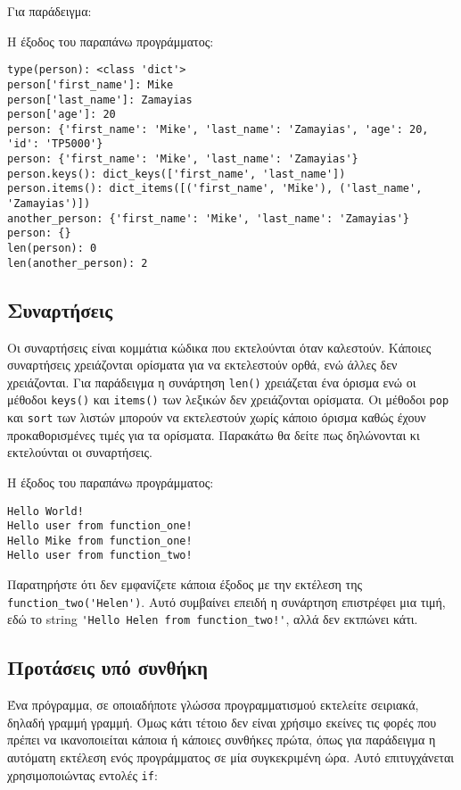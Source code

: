 \documentclass[12pt]{extreport}
\begin{document}
Για παράδειγμα:



Η έξοδος του παραπάνω προγράμματος:

\begin{lstlisting}[language={}]
type(person): <class 'dict'>
person['first_name']: Mike
person['last_name']: Zamayias
person['age']: 20
person: {'first_name': 'Mike', 'last_name': 'Zamayias', 'age': 20, 'id': 'TP5000'}
person: {'first_name': 'Mike', 'last_name': 'Zamayias'}
person.keys(): dict_keys(['first_name', 'last_name'])
person.items(): dict_items([('first_name', 'Mike'), ('last_name', 'Zamayias')])
another_person: {'first_name': 'Mike', 'last_name': 'Zamayias'}
person: {}
len(person): 0
len(another_person): 2
\end{lstlisting}




\newpage
\subsection{Συναρτήσεις}
Οι συναρτήσεις είναι κομμάτια κώδικα που εκτελούνται όταν καλεστούν. Κάποιες συναρτήσεις χρειάζονται ορίσματα για να εκτελεστούν ορθά, ενώ άλλες δεν χρειάζονται. Για παράδειγμα η συνάρτηση \lstinline{len()} χρειάζεται ένα όρισμα ενώ οι μέθοδοι \lstinline{keys()} και \lstinline{items()} των λεξικών δεν χρειάζονται ορίσματα. Οι μέθοδοι \lstinline{pop} και \lstinline{sort} των λιστών μπορούν να εκτελεστούν χωρίς κάποιο όρισμα καθώς έχουν προκαθορισμένες τιμές για τα ορίσματα. Παρακάτω θα δείτε πως δηλώνονται κι εκτελούνται οι συναρτήσεις.



Η έξοδος του παραπάνω προγράμματος:

\begin{lstlisting}[language={}]
Hello World!
Hello user from function_one!
Hello Mike from function_one!
Hello user from function_two!
\end{lstlisting}

Παρατηρήστε ότι δεν εμφανίζετε κάποια έξοδος με την εκτέλεση της \lstinline{function_two('Helen')}. Αυτό συμβαίνει επειδή η συνάρτηση επιστρέφει μια τιμή, εδώ το string \lstinline{'Hello Helen from function_two!'}, αλλά δεν εκτπώνει κάτι.
\subsection{Προτάσεις υπό συνθήκη}
Ένα πρόγραμμα, σε οποιαδήποτε γλώσσα προγραμματισμού εκτελείτε σειριακά, δηλαδή γραμμή γραμμή. Όμως κάτι τέτοιο δεν είναι χρήσιμο εκείνες τις φορές που πρέπει να ικανοποιείται κάποια ή κάποιες συνθήκες πρώτα, όπως για παράδειγμα η αυτόματη εκτέλεση ενός προγράμματος σε μία συγκεκριμένη ώρα. Αυτό επιτυγχάνεται χρησιμοποιώντας εντολές \lstinline{if}:
\end{document}
